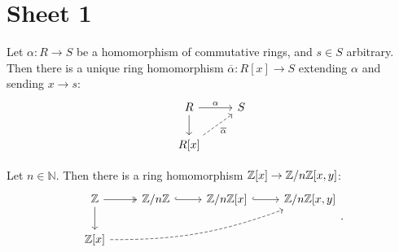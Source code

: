 \section{Sheet 1}
\begin{prop}
Let $\alpha: R\to S$ be a homomorphism of commutative rings, and  $s\in S$ arbitrary. Then there is a unique ring homomorphism $\overline{\alpha}:R[x]\to S$ extending $\alpha$ and sending $x\to s$:
\[
\begin{tikzcd}
  R\ar{r}{\alpha}\ar{d}&S\\
  R[x]\ar[swap,dashed]{ur}{\overline{\alpha}}&
\end{tikzcd}
\]
\end{prop}
\begin{cor}
  Let $n\in \mathbb{N}$. Then there is a ring homomorphism $\mathbb{Z}[x]\to \mathbb{Z}/n\mathbb{Z}[x,y]$:
  \[
  \begin{tikzcd}
    \zz \ar[\surarr]{r}\ar{d}&\zz/n\zz\ar[\embarr]{r}&\zz/n\zz[x]\ar[\embarr]{r}&\zz/n\zz[x,y]\\
    \zz[x]\ar[dashed,bend right=10]{urrr}
  \end{tikzcd}.
  \]
\end{cor}
